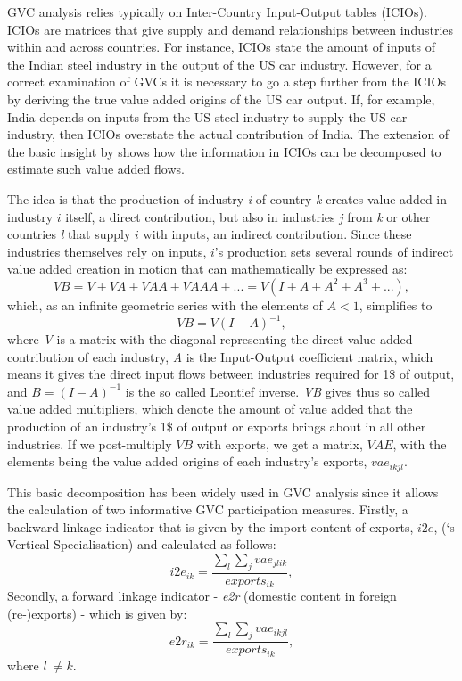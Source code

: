 \documentclass[11pt,a4paper]{article}
\begin{document}
GVC analysis relies typically on Inter-Country Input-Output tables (ICIOs). ICIOs are matrices that give supply and demand relationships between industries within and across countries. For instance, ICIOs state the amount of inputs of the Indian steel industry in the output of the US car industry. However, for a correct examination of GVCs it is necessary to go a step further from the ICIOs by deriving the true value added origins of the US car output. If, for example, India depends on inputs from the US steel industry to supply the US car industry, then ICIOs overstate the actual contribution of India. The extension of the basic \citet{wale36} insight by \citet{dahuetal01} shows how the information in ICIOs can be decomposed to estimate such value added flows.

The idea is that the production of industry \textit{i} of country \textit{k} creates value added in industry $i$ itself, a direct contribution, but also in industries \textit{j} from \textit{k} or other countries \textit{l} that supply $i$ with inputs, an indirect contribution. Since these industries themselves rely on inputs, $i$'s production sets several rounds of indirect value added creation in motion that can mathematically be expressed as:
\begin{equation}
VB = V + VA + VAA + VAAA + ... = V (I+A+A^{2}+A^{3}+...),
\end{equation}
which, as an infinite geometric series with the elements of $A<1$, simplifies to
\begin{equation}
VB = V (I-A)^{-1},
\end{equation}
where \textit{V} is a matrix with the diagonal representing the direct value added contribution of each industry, \textit{A} is the Input-Output coefficient matrix, which means it gives the direct input flows between industries required for 1\$ of output, and $B = (I-A)^{-1}$ is the so called Leontief inverse. \textit{VB} gives thus so called value added multipliers, which denote the amount of value added that the production of an industry's 1\$ of output or exports brings about in all other industries. If we post-multiply $VB$ with exports, we get a matrix, $VAE$, with the elements being the value added origins of each industry's exports, $vae_{ikjl}$.
 
This basic decomposition has been widely used in GVC analysis since it allows the calculation of two informative GVC participation measures. Firstly, a backward linkage indicator that is given by the import content of exports, $i2e$, (\citet{dahuetal01}`s Vertical Specialisation) and calculated as follows:
\begin{equation}
i2e_{ik} = \frac{\sum_{l}{\sum_{j}vae_{jlik}}}{exports_{ik}} ,
\end{equation}
Secondly, a forward linkage indicator - \emph{e2r} (domestic content in foreign (re-)exports) - which is given by:
\begin{equation}\label{eq:dvar}
{e2r}_{ik} = \frac{\sum_{l}{\sum_{j} vae_{ikjl}}}{exports_{ik}} ,
\end{equation}
where \(l\  \neq k\).
\end{document}
